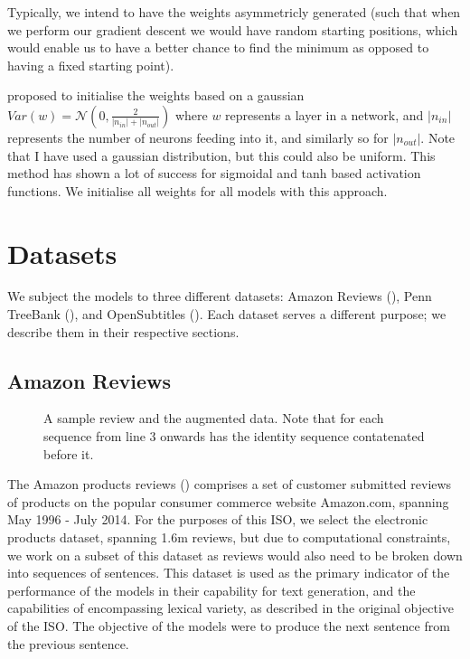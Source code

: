 \documentclass[12pt,twoside]{report}
\begin{document}
Typically, we intend to have the weights asymmetricly generated (such that when we perform our gradient descent we would have random starting positions, which would enable us to have a better chance to find the minimum as opposed to having a fixed starting point).

\cite{glorot_understanding_2010} proposed to initialise the weights based on a gaussian $Var(w)=\mathcal{N}(0,\frac{2}{|n_{in}| + |n_{out}| })$ where $w$ represents a layer in a network, and $|n_{in}|$ represents the number of neurons feeding into it, and similarly so for $|n_{out}|$. Note that I have used a gaussian distribution, but this could also be uniform. This method has shown a lot of success for sigmoidal and tanh based activation functions. We initialise all weights for all models with this approach.

\section{Datasets}

We subject the models to three different datasets: Amazon Reviews (\cite{he_ups_2016}), Penn TreeBank (\cite{marcus_building_2002}), and OpenSubtitles (\cite{lison_opensubtitles2016:_2016}). Each dataset serves a different purpose; we describe them in their respective sections.

\subsection{Amazon Reviews}

\begin{figure}[!ht]
	\centering
	
	
	\caption{A sample review and the augmented data. Note that for each sequence from line 3 onwards has the identity sequence contatenated before it. \label{ex_dataset:amazon}}
\end{figure}

The Amazon products reviews (\cite{he_ups_2016}) comprises a set of customer submitted reviews of products on the popular consumer commerce website Amazon.com, spanning May 1996 - July 2014. For the purposes of this ISO, we select the electronic products dataset, spanning 1.6m reviews, but due to computational constraints, we work on a subset of this dataset as reviews would also need to be broken down into sequences of sentences. This dataset is used as the primary indicator of the performance of the models in their capability for text generation, and the capabilities of encompassing lexical variety, as described in the original objective of the ISO. The objective of the models were to produce the next sentence from the previous sentence. 
\end{document}
